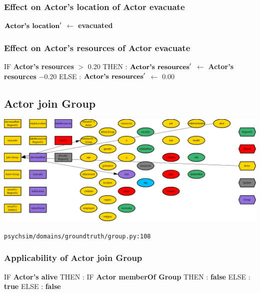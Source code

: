 \documentclass{article}%
\begin{document}
%
\subsubsection{Effect on Actor's location of Actor evacuate}%
\label{ssubsec:Effect on Actor's location of Actor evacuate}%
\begin{flushleft}%
$\mbox{\textbf{Actor's location}} '$%
$\leftarrow$%
\textbf{evacuated}%
\end{flushleft}

%
\subsubsection{Effect on Actor's resources of Actor evacuate}%
\label{ssubsec:Effect on Actor's resources of Actor evacuate}%
\begin{flushleft}%
IF %
\textbf{Actor's resources}%
$>$%
0.20%
\linebreak%
\hspace*{2em}%
THEN %
: %
$\mbox{\textbf{Actor's resources}} '$%
$\leftarrow$%
\textbf{Actor's resources}%
${-}0.20$%
\linebreak%
\hspace*{2em}%
ELSE %
: %
$\mbox{\textbf{Actor's resources}} '$%
$\leftarrow$%
0.00%
\end{flushleft}

%
\subsection{Actor join Group}%
\label{subsec:Actor join Group}%
\includegraphics[width=\textwidth]{images/Actor-join-Group.png}%
\begin{flushleft}%
\verb|psychsim/domains/groundtruth/group.py:108|%
\end{flushleft}%
\subsubsection{Applicability of Actor join Group}%
\label{ssubsec:Applicability of Actor join Group}%
\begin{flushleft}%
IF %
\textbf{Actor's alive}%
\linebreak%
\hspace*{2em}%
THEN %
: %
IF %
\textbf{Actor memberOf Group}%
\linebreak%
\hspace*{4em}%
THEN %
: %
\textbf{false}%
\linebreak%
\hspace*{4em}%
ELSE %
: %
\textbf{true}%
\linebreak%
\hspace*{2em}%
ELSE %
: %
\textbf{false}%
\end{flushleft}
\end{document}
